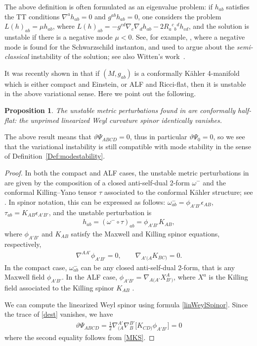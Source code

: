 \documentclass[pdftex]{sigma}
\numberwithin{equation}{section}
\newtheorem{Proposition}[Theorem]{Proposition}
\begin{document}
The above definition is often formulated as an eigenvalue problem: if $h_{ab}$ satisfies the TT conditions $\nabla^{a}h_{ab} = 0$ and $g^{ab}h_{ab} = 0$, one considers the problem $L(h)_{ab}=\mu h_{ab}$, where $L(h)_{ab}=-g^{cd}\nabla_{c}\nabla_{d}h_{ab}-2R_{a}{}^{c}{}_{b}{}^{d}h_{cd}$, and the solution is unstable if there is a negative mode $\mu<0$. See, for example, \cite[Section V]{Gross}, where a negative mode is found for the Schwarzschild instanton, and used to argue about the {\em semi-classical} instability of the solution; see also Witten's work~\cite{Witten}.

It was recently shown in \cite{BiquardOzuch} that if $(M,g_{ab})$ is a conformally K\"ahler 4-manifold which is either compact and Einstein, or ALF and Ricci-flat, then it is unstable in the above variational sense. Here we point out the following.
\begin{Proposition}
The unstable metric perturbations found in {\rm \cite{BiquardOzuch}} are conformally half-flat: the unprimed linearized Weyl curvature spinor identically vanishes.
\end{Proposition}

\begin{Remark}
The above result means that $\vartheta\Psi_{ABCD}=0$, thus in particular $\vartheta\Psi_0=0$, so we see that the variational instability is still compatible with mode stability in the sense of Definition~\ref{Def:modestability}.
\end{Remark}

\begin{proof}
In both the compact and ALF cases, the unstable metric perturbations in \cite{BiquardOzuch} are given by the composition of a closed anti-self-dual 2-form $\omega^{-}$ and the conformal Killing--Yano tensor $\tau$ associated to the conformal K\"ahler structure; see \cite{BiquardOzuch}. In spinor notation, this can be expressed as follows: $\omega^{-}_{ab}=\phi_{A'B'}\epsilon_{AB}$, $\tau_{ab}=K_{AB}\epsilon_{A'B'}$, and the unstable perturbation is
\begin{align} \label{dest}
h_{ab} = (\omega^{-}\circ\tau)_{ab} = \phi_{A'B'}K_{AB},
\end{align}
where $\phi_{A'B'}$ and $K_{AB}$ satisfy the Maxwell and Killing spinor equations, respectively,
\begin{align} \label{MKS}
\nabla^{AA'}\phi_{A'B'} = 0, \qquad \nabla_{A'(A}K_{BC)}=0.
\end{align}
In the compact case, $\omega^{-}_{ab}$ can be any closed anti-self-dual 2-form, that is any Maxwell field $\phi_{A'B'}$. In the ALF case, $\phi_{A'B'}=\nabla_{A(A'}X^{A}_{B')}$, where $X^a$ is the Killing field associated to the Killing spinor $K_{AB}$ \cite{BiquardOzuch}.

We can compute the linearized Weyl spinor using formula \eqref{linWeylSpinor}. Since the trace of \eqref{dest} vanishes, we have
\begin{align*}
\vartheta\Psi_{ABCD}
= \frac{1}{2}\nabla_{(A}^{A'}\nabla_{B}^{B'}\bigl[K_{CD)}\phi_{A'B'}\bigr]
= 0
\end{align*}
where the second equality follows from \eqref{MKS}.
\end{proof}
\end{document}

